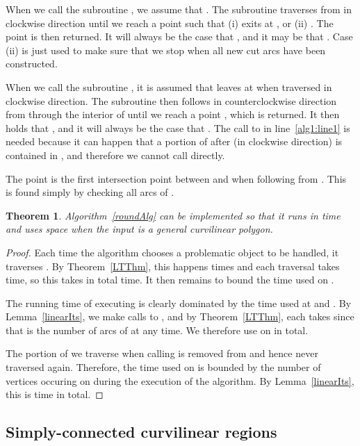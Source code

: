\documentclass{article}
\newtheorem{theorem}{Theorem}[section]
\begin{document}
When we call the subroutine , we assume that .
The subroutine traverses  from  in clockwise direction until we reach a point  such that (i)  exits  at , or (ii) .
The point  is then returned.
It will always be the case that , and it may be that .
Case (ii) is just used to make sure that we stop when all new cut arcs have been constructed.

When we call the subroutine , it is assumed that  leaves  at  when traversed in clockwise direction.
The subroutine then follows  in counterclockwise direction from  through the interior of  until we reach a point , which is returned.
It then holds that , and it will always be the case that .
The call to  in line~\ref{alg1:line1} is needed because it can happen that a portion of  after  (in clockwise direction) is contained in , and therefore we cannot call  directly.

The point  is the first intersection point between  and  when following  from
.
This is found simply by checking all arcs of .

\begin{theorem}\label{finalThmGen}
Algorithm~\ref{roundAlg} can be implemented so that it runs in time  and uses  space when the input is a general curvilinear polygon.
\end{theorem}

\begin{proof}
Each time the algorithm chooses a problematic object to be handled, it traverses .
By Theorem~\ref{LTThm}, this happens  times and each traversal takes  time, so this takes in total  time.
It then remains to bound the time used on .

The running time of executing  is clearly dominated by the time used at  and .
By Lemma~\ref{linearIts}, we make  calls to , and by Theorem~\ref{LTThm}, each takes  since that is the number of arcs of  at any time.
We therefore use  on  in total.

The portion of  we traverse when calling
 is removed from  and hence never traversed again.
Therefore, the time used on  is bounded by the number of
vertices occuring on  during the execution of the algorithm.
By Lemma~\ref{linearIts}, this is  time in total.
\end{proof}

\subsection{Simply-connected curvilinear regions}\label{anImplementation:simply}
\end{document}
